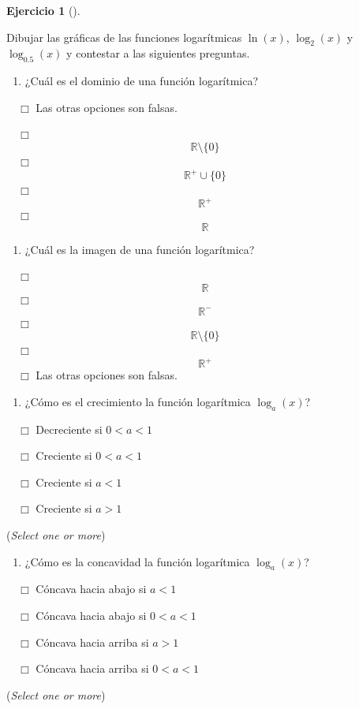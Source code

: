 \documentclass[
  a4paper,
]{scrreport}
\providecommand{\tightlist}{%
  \setlength{\itemsep}{0pt}\setlength{\parskip}{0pt}}\usepackage{longtable,booktabs,array}
\theoremstyle{definition}
\newtheorem{exercise}{Ejercicio}[chapter]
\theoremstyle{remark}
\begin{document}
\begin{exercise}[]\protect\hypertarget{exr-funciones-logaritmicas}{}\label{exr-funciones-logaritmicas}

Dibujar las gráficas de las funciones logarítmicas \(\ln(x)\),
\(\log_2(x)\) y \(\log_{0.5}(x)\) y contestar a las siguientes
preguntas.

\begin{enumerate}
\def\labelenumi{\alph{enumi}.}
\tightlist
\item
  ¿Cuál es el dominio de una función logarítmica?
\end{enumerate}

${\quad\Box}$ Las otras opciones son falsas.

${\quad\Box}$ $$\mathbb{R}\setminus\{0\}$$
${\quad\Box}$ $$\mathbb{R}^+\cup \{0\}$$
${\quad\Box}$ $$\mathbb{R}^+$$
${\quad\Box}$ $$\mathbb{R}$$

\begin{enumerate}
\def\labelenumi{\alph{enumi}.}
\setcounter{enumi}{1}
\tightlist
\item
  ¿Cuál es la imagen de una función logarítmica?
\end{enumerate}

${\quad\Box}$ $$\mathbb{R}$$
${\quad\Box}$ $$\mathbb{R}^-$$
${\quad\Box}$ $$\mathbb{R}\setminus\{0\}$$
${\quad\Box}$ $$\mathbb{R}^+$$
${\quad\Box}$ Las otras opciones son falsas.

\begin{enumerate}
\def\labelenumi{\alph{enumi}.}
\setcounter{enumi}{2}
\tightlist
\item
  ¿Cómo es el crecimiento la función logarítmica \(\log_a(x)\)?
\end{enumerate}

${\quad\Box}$ Decreciente si $0 < a <1$

${\quad\Box}$ Creciente si $0 < a < 1$

${\quad\Box}$ Creciente si $a<1$

${\quad\Box}$ Creciente si $a>1$

(\emph{Select one or more})

\begin{enumerate}
\def\labelenumi{\alph{enumi}.}
\setcounter{enumi}{3}
\tightlist
\item
  ¿Cómo es la concavidad la función logarítmica \(\log_a(x)\)?
\end{enumerate}

${\quad\Box}$ Cóncava hacia abajo si $a<1$

${\quad\Box}$ Cóncava hacia abajo si $0 < a < 1$

${\quad\Box}$ Cóncava hacia arriba si $a>1$

${\quad\Box}$ Cóncava hacia arriba si $0 < a < 1$

(\emph{Select one or more})

\end{exercise}
\end{document}
